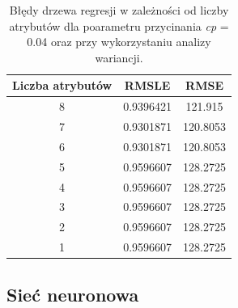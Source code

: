 \documentclass[a4paper,12pt]{article}
\begin{document}
        \begin{table}
        	\centering
            \begin{tabular}{|c|c|c|}
                \hline
                Liczba atrybutów & RMSLE & RMSE \\
                \hline
                8 & 0.9396421 & 121.915 \\
                \hline
                7 & 0.9301871 & 120.8053 \\
                \hline
                6 & 0.9301871 & 120.8053 \\
                \hline
                5 & 0.9596607 & 128.2725 \\
                \hline
                4 & 0.9596607 & 128.2725 \\
                \hline
                3 & 0.9596607 & 128.2725 \\
                \hline
                2 & 0.9596607 & 128.2725 \\
                \hline
                1 & 0.9596607 & 128.2725 \\
                \hline
            \end{tabular}
            \caption{Błędy drzewa regresji w zależności od liczby atrybutów dla poarametru przycinania \textit{cp} = 0.04 oraz przy wykorzystaniu analizy wariancji.}
            \label{tab:regtree2}
        \end{table}
    
    \subsection{Sieć neuronowa}
\end{document}
